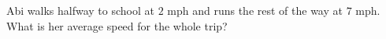 Abi walks halfway to school at $2$ mph and runs the rest of the way at $7$ mph. What is her average speed for the whole trip?
